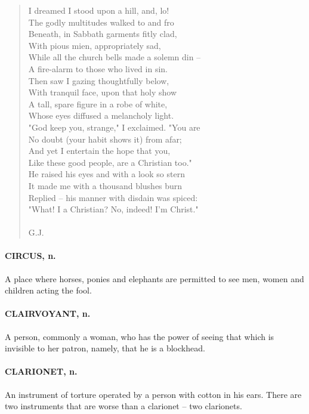 \documentclass[11pt]{article}
\begin{document}
\begin{quote}   I dreamed I stood upon a hill, and, lo! \\
  The godly multitudes walked to and fro \\
  Beneath, in Sabbath garments fitly clad, \\
  With pious mien, appropriately sad, \\
  While all the church bells made a solemn din -- \\
  A fire-alarm to those who lived in sin. \\
  Then saw I gazing thoughtfully below, \\
  With tranquil face, upon that holy show \\
  A tall, spare figure in a robe of white, \\
  Whose eyes diffused a melancholy light. \\
  "God keep you, strange," I exclaimed.  "You are \\
  No doubt (your habit shows it) from afar; \\
  And yet I entertain the hope that you, \\
  Like these good people, are a Christian too." \\
  He raised his eyes and with a look so stern \\
  It made me with a thousand blushes burn \\
  Replied -- his manner with disdain was spiced: \\
  "What!  I a Christian?  No, indeed!  I'm Christ." \\
 \\
G.J. \end{quote}


\paragraph{CIRCUS, n.}  A place where horses, ponies and elephants are permitted
to see men, women and children acting the fool.

\paragraph{CLAIRVOYANT, n.}  A person, commonly a woman, who has the power of
seeing that which is invisible to her patron, namely, that he is a
blockhead.

\paragraph{CLARIONET, n.}  An instrument of torture operated by a person with
cotton in his ears.  There are two instruments that are worse than a
clarionet -- two clarionets.
\end{document}
